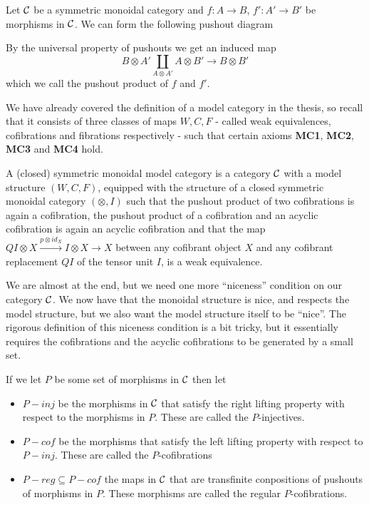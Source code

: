 \begin{definition}
Let $\mathcal{C}$ be a symmetric monoidal category and $f\colon A\to B$, $f'\colon A'\to B'$ be morphisms in $\mathcal{C}$. We can form the following pushout diagram
\begin{center}
\end{center}
By the universal property of pushouts we get an induced map
\begin{equation*}
    B\otimes A' \coprod_{A\otimes A'} A\otimes B' \longrightarrow B\otimes B'
\end{equation*}
which we call the pushout product of $f$ and $f'$. 
\end{definition}

We have already covered the definition of a model category in the thesis, so recall that it consists of three classes of maps $W, C, F$ - called weak equivalences, cofibrations and fibrations respectively - such that certain axioms \textbf{MC1}, \textbf{MC2}, \textbf{MC3} and \textbf{MC4} hold. 

\begin{definition}
A (closed) symmetric monoidal model category is a category $\mathcal{C}$ with a model structure $(W, C, F)$, equipped with the structure of a closed symmetric monoidal category $(\otimes, I)$ such that the pushout product of two cofibrations is again a cofibration, the pushout product of a cofibration and an acyclic cofibration is again an acyclic cofibration and that the map $QI\otimes X \overset{p\otimes id_X}\to I\otimes X \to X$ between any cofibrant object $X$ and any cofibrant replacement $QI$ of the tensor unit $I$, is a weak equivalence. 
\end{definition}

We are almost at the end, but we need one more ``niceness'' condition on our category $\mathcal{C}$. We now have that the monoidal structure is nice, and respects the model structure, but we also want the model structure itself to be ``nice''. The rigorous definition of this niceness condition is a bit tricky, but it essentially requires the cofibrations and the acyclic cofibrations to be generated by a small set. 

If we let $P$ be some set of morphisms in $\mathcal{C}$ then let 
\begin{itemize}
    \item $P-inj$ be the morphisms in $\mathcal{C}$ that satisfy the right lifting property with respect to the morphisms in $P$. These are called the $P$-injectives.
    \item $P-cof$ be the morphisms that satisfy the left lifting property with respect to $P-inj$. These are called the $P$-cofibrations
    \item $P-reg \subseteq P-cof$ the maps in $\mathcal{C}$ that are transfinite conpositions of pushouts of morphisms in $P$. These morphisms are called the regular $P$-cofibrations. 
\end{itemize}

